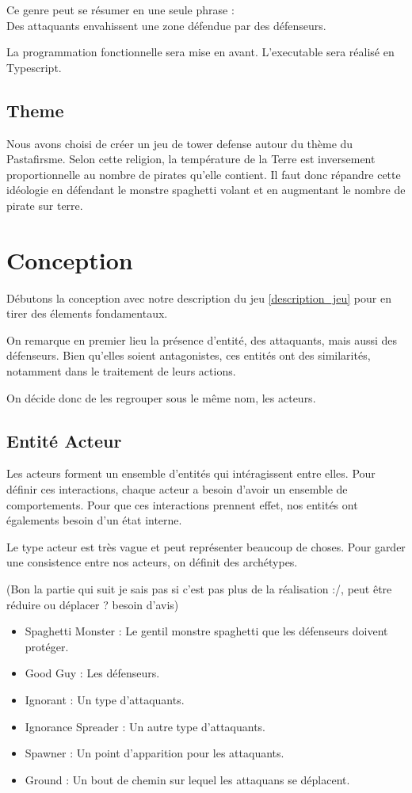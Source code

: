 \documentclass{article}
\begin{document}
Ce genre peut se résumer en une seule phrase :\\
\center \label{description_jeu} Des attaquants envahissent une zone défendue par des défenseurs.

La programmation fonctionnelle sera mise en avant.
L'executable sera réalisé en Typescript.

\subsection{Theme}
Nous avons choisi de créer un jeu de tower defense autour du thème
du Pastafirsme.
Selon cette religion, la température de la Terre est inversement proportionnelle 
au nombre de pirates qu’elle contient.
Il faut donc répandre cette idéologie en défendant le monstre spaghetti volant et 
en augmentant le nombre de pirate sur terre.

\section{Conception}

Débutons la conception avec notre description du jeu \ref{description_jeu} 
pour en tirer des élements fondamentaux.

On remarque en premier lieu la présence d'entité, des attaquants, mais aussi des 
défenseurs. Bien qu'elles soient antagonistes, ces entités ont des similarités, notamment 
dans le traitement de leurs actions. 

On décide donc de les regrouper sous le même nom, les acteurs.


\subsection{Entité Acteur}

Les acteurs forment un ensemble d'entités qui intéragissent entre elles.
Pour définir ces interactions, chaque acteur a besoin d'avoir un ensemble 
de comportements. Pour que ces interactions prennent effet, nos entités ont 
égalements besoin d'un état interne.

Le type acteur est très vague et peut représenter beaucoup de choses.
Pour garder une consistence entre nos acteurs, on définit des archétypes.

(Bon la partie qui suit je sais pas si c'est pas plus de la réalisation :/, 
peut être réduire ou déplacer ? besoin d'avis)

\begin{itemize}
   \item Spaghetti Monster : Le gentil monstre spaghetti que les défenseurs doivent protéger.
   \item Good Guy : Les défenseurs.
   \item Ignorant : Un type d'attaquants.
   \item Ignorance Spreader : Un autre type d'attaquants.
   \item Spawner : Un point d'apparition pour les attaquants.
   \item Ground : Un bout de chemin sur lequel les attaquans se déplacent.
\end{itemize}
\end{document}
